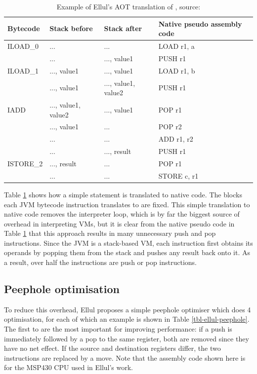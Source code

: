 \begin{table}
\caption[Example of Ellul's AOT translation of ]{Example of Ellul's AOT translation of , source: \cite{Ellul:2012thesis}}
\label{tbl-ellul-aot-example}
    \begin{tabular}{llll} %
    \toprule
    Bytecode  & Stack before        & Stack after         & Native pseudo assembly code \\
    \midrule
    \midrule
    ILOAD\_0  & ...                 & ...                 & LOAD r1, a \\
              & ...                 & ..., value1         & PUSH r1 \\
    ILOAD\_1  & ..., value1         & ..., value1         & LOAD r1, b \\
              & ..., value1         & ..., value1, value2 & PUSH r1 \\
    IADD      & ..., value1, value2 & ..., value1         & POP r1 \\
              & ..., value1         & ...                 & POP r2 \\
              & ...                 & ...                 & ADD r1, r2 \\
              & ...                 & ..., result         & PUSH r1 \\
    ISTORE\_2 & ..., result         & ...                 & POP r1 \\
              & ...                 & ...                 & STORE c, r1 \\
    \bottomrule
    \end{tabular}
\end{table}

Table \ref{tbl-ellul-aot-example} shows how a simple statement is translated to native code. The blocks each JVM bytecode instruction translates to are fixed. This simple translation to native code removes the interpreter loop, which is by far the biggest source of overhead in interpreting VMs, but it is clear from the native pseudo code in Table \ref{tbl-ellul-aot-example} that this approach results in many unnecessary push and pop instructions. Since the JVM is a stack-based VM, each instruction first obtains its operands by popping them from the stack and pushes any result back onto it. As a result, over half the instructions are push or pop instructions.

\subsection{Peephole optimisation}
To reduce this overhead, Ellul proposes a simple peephole optimiser \cite{Ellul:2012thesis} which does 4 optimisation, for each of which an example is shown in Table \ref{tbl-ellul-peephole}. The first to are the most important for improving performance: if a push is immediately followed by a pop to the same register, both are removed since they have no net effect. If the source and destination registers differ, the two instructions are replaced by a move. Note that the assembly code shown here is for the MSP430 CPU used in Ellul's work.

